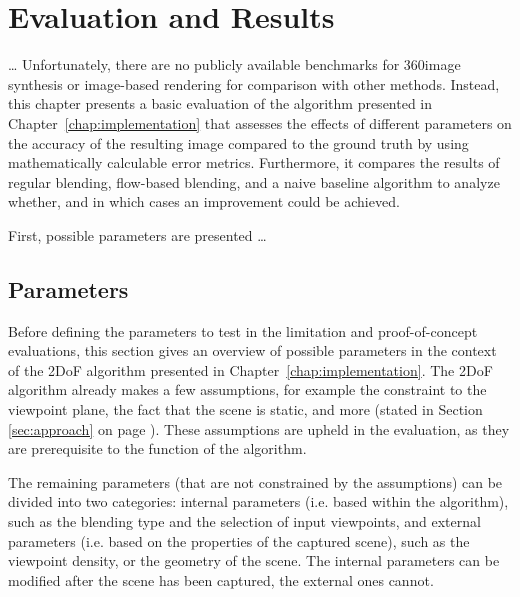 \chapter{Evaluation and Results} \label{chap:evaluation}
\ldots
Unfortunately, there are no publicly available benchmarks for 360\degree image synthesis or image-based rendering for comparison with other methods. Instead, this chapter presents a basic evaluation of the algorithm presented in Chapter~\ref{chap:implementation} that assesses the effects of different parameters on the accuracy of the resulting image compared to the ground truth by using mathematically calculable error metrics. Furthermore, it compares the results of regular blending, flow-based blending, and a naive baseline algorithm to analyze whether, and in which cases an improvement could be achieved.

First, possible parameters are presented \ldots {}



\section{Parameters}
Before defining the parameters to test in the limitation and proof-of-concept evaluations, this section gives an overview of possible parameters in the context of the 2DoF algorithm presented in Chapter~\ref{chap:implementation}.
The 2DoF algorithm already makes a few assumptions, for example the constraint to the viewpoint plane, the fact that the scene is static, and more (stated in Section \ref{sec:approach} on page \pageref{sec:approach}). These assumptions are upheld in the evaluation, as they are prerequisite to the function of the algorithm.

The remaining parameters (that are not constrained by the assumptions) can be divided into two categories: internal parameters (i.e. based within the algorithm), such as the blending type and the selection of input viewpoints, and external parameters (i.e. based on the properties of the captured scene), such as the viewpoint density, or the geometry of the scene. The internal parameters can be modified after the scene has been captured, the external ones cannot.

